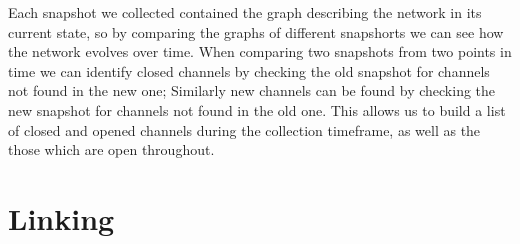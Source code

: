 Each snapshot we collected contained the graph describing the network in its current state, so by comparing the graphs of different snapshorts we can see how the network evolves over time. When comparing two snapshots from two points in time we can identify closed channels by checking the old snapshot for channels not found in the new one; Similarly new channels can be found by checking the new snapshot for channels not found in the old one. This allows us to build a list of closed and opened channels during the collection timeframe, as well as the those which are open throughout. 



\section{Linking}
\label{sec:linking}


